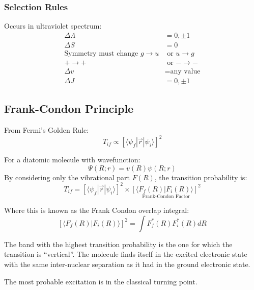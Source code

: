 \documentclass[12pt]{article}
\begin{document}
\subsubsection{Selection Rules}
Occurs in ultraviolet spectrum:
\begin{align*}
    \Delta \Lambda &= 0, \pm 1\\
    \Delta S &= 0\\
    \text{Symmetry must change } g\to u &\text{ or } u \to g\\
    + \to + &\text{ or } - \to -\\
    \Delta v &= \text{any value}\\
    \Delta J &= 0, \pm 1
\end{align*}

\subsection{Frank-Condon Principle}
From Fermi's Golden Rule:
\[ T_{if} \propto \left[ \langle \psi_f|\vec{r}|\psi_i\rangle \right]^2\]

For a diatomic molecule with wavefunction:
\[\Psi(R;r) = v(R)\psi(R;r)\]
By considering only the vibrational part $F(R)$, the transition probability is:
\[T_{if} = \left[ \langle \psi_f|\vec{r}|\psi_i\rangle \right]^2 \times \underset{\text{Frank-Condon Factor}}{[\langle F_f(R)|F_i(R)\rangle ]^2}\]

Where this is known as the Frank Condon overlap integral:
\[[\langle F_f(R)|F_i(R)\rangle ]^2 = \int F_f^*(R) F_i^*(R) dR\]

The band with the highest transition probability is the one for which the
transition is “vertical”. The molecule finds itself in the excited electronic state
with the same inter-nuclear separation as it had in the ground electronic state.

The most probable excitation is in the classical turning point.
\end{document}
